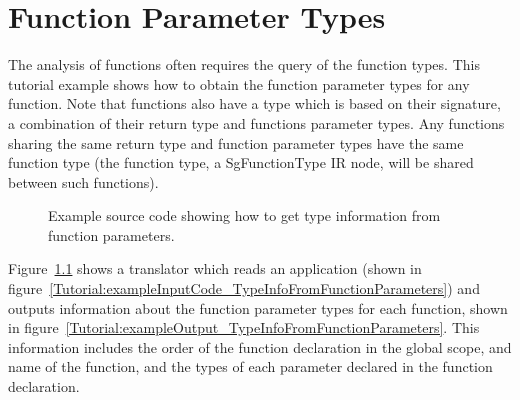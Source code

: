 \chapter{Function Parameter Types}

   The analysis of functions often requires the query of the
function types.  This tutorial example shows how to obtain 
the function parameter types for any function.  Note that functions
also have a type which is based on their signature, a combination
of their return type and functions parameter types.  Any functions 
sharing the same return type and function parameter types have the 
same function type (the function type, a SgFunctionType IR node, 
will be shared between such functions).

\begin{figure}[!h]
{\indent
{\mySmallFontSize


\begin{latexonly}
   
\end{latexonly}

\begin{htmlonly}
   
\end{htmlonly}

}
}
\caption{Example source code showing how to get type information from function parameters.}
\label{Tutorial:exampleTypeInfoFromFunctionParameters}
\end{figure}

   Figure~\ref{Tutorial:exampleTypeInfoFromFunctionParameters} shows a translator which
reads an application (shown in
figure~\ref{Tutorial:exampleInputCode_TypeInfoFromFunctionParameters}) 
and outputs information about the function parameter types for each function,
shown in figure~\ref{Tutorial:exampleOutput_TypeInfoFromFunctionParameters}.
This information includes the order of the function declaration in the global
scope, and name of the function, and the types of each parameter declared in 
the function declaration.

